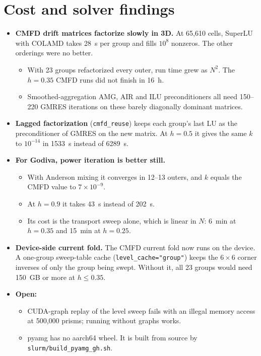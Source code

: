 \documentclass[a4paper,10pt]{article}
\newcommand{\code}[1]{\texttt{#1}}
\begin{document}
\section{Cost and solver findings}

\begin{itemize}
\item \textbf{CMFD drift matrices factorize slowly in 3D.} At 65,610
  cells, SuperLU with COLAMD takes 28~s per group and fills
  $10^8$ nonzeros. The other orderings were no better.
  \begin{itemize}
  \item With 23 groups refactorized every outer, run time grew as $N^2$. The
    $h = 0.35$ CMFD runs did not finish in 16~h.
  \item Smoothed-aggregation AMG, AIR and ILU preconditioners all need
    150--220 GMRES iterations on these barely diagonally dominant matrices.
  \end{itemize}
\item \textbf{Lagged factorization} (\code{cmfd\_reuse}) keeps each group's
  last LU as the preconditioner of GMRES on the new matrix. At $h = 0.5$ it
  gives the same $k$ to $10^{-14}$ in 1533~s instead of 6289~s.
\item \textbf{For Godiva, power iteration is better still.}
  \begin{itemize}
  \item With Anderson mixing it converges in 12--13 outers, and $k$ equals
    the CMFD value to $7\times10^{-9}$.
  \item At $h = 0.9$ it takes 43~s instead of 202~s.
  \item Its cost is the transport sweep alone, which is linear in $N$:
    6~min at $h = 0.35$ and 15~min at $h = 0.25$.
  \end{itemize}
\item \textbf{Device-side current fold.} The CMFD current fold now runs on the
  device. A one-group sweep-table cache (\code{level\_cache="group"}) keeps
  the $6\times6$ corner inverses of only the group being swept. Without it,
  all 23 groups would need 150~GB or more at $h \le 0.35$.
\item \textbf{Open:}
  \begin{itemize}
  \item CUDA-graph replay of the level sweep fails with an illegal memory
    access at 500,000 prisms; running without graphs works.
  \item pyamg has no aarch64 wheel. It is built from source by
    \code{slurm/build\_pyamg\_gh.sh}.
  \end{itemize}
\end{itemize}
\end{document}
